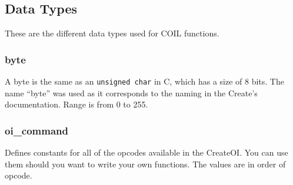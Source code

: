 \documentclass {article}
\begin{document}
\subsection {Data Types} \hypertarget{datatypes}{} These are the
different data types used for COIL functions.

\subsubsection {byte} \hypertarget{oibyte}{} A byte is the same as an
{\tt unsigned char} in C, which has a size of 8 bits.  The name
``byte'' was used as it corresponds to the naming in the Create's
documentation.  Range is from 0 to 255.

\subsubsection {oi\_command} \hypertarget{oicommand}{} Defines
constants for all of the opcodes available in the CreateOI.  You can
use them should you want to write your own functions.  The values are
in order of opcode.
\end{document}
